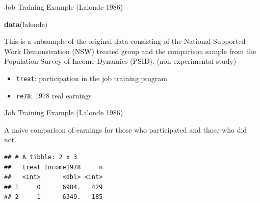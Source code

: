 \documentclass[ignorenonframetext,]{beamer}
\newenvironment{Shaded}{\begin{snugshade}}{\end{snugshade}}
\newcommand{\KeywordTok}[1]{\textcolor[rgb]{0.13,0.29,0.53}{\textbf{#1}}}
\newcommand{\DataTypeTok}[1]{\textcolor[rgb]{0.13,0.29,0.53}{#1}}
\newcommand{\StringTok}[1]{\textcolor[rgb]{0.31,0.60,0.02}{#1}}
\newcommand{\OperatorTok}[1]{\textcolor[rgb]{0.81,0.36,0.00}{\textbf{#1}}}
\newcommand{\NormalTok}[1]{#1}
\providecommand{\tightlist}{%
  \setlength{\itemsep}{0pt}\setlength{\parskip}{0pt}}
\begin{document}
\begin{frame}[fragile]{Job Training Example (Lalonde 1986)}

\begin{Shaded}
\begin{Highlighting}[]
\KeywordTok{data}\NormalTok{(lalonde)}
\end{Highlighting}
\end{Shaded}

This is a subsample of the original data consisting of the National
Supported Work Demonstration (NSW) treated group and the comparison
sample from the Population Survey of Income Dynamics (PSID).
(non-experimental study)

\begin{itemize}
\tightlist
\item
  \texttt{treat}: participation in the job training program
\item
  \texttt{re78}: 1978 real earnings
\end{itemize}

\end{frame}

\begin{frame}[fragile]{Job Training Example (Lalonde 1986)}

A naive comparison of earnings for those who participated and those who
did not.

\small

\begin{Shaded}
\end{Shaded}

\begin{verbatim}
## # A tibble: 2 x 3
##   treat Income1978     n
##   <int>      <dbl> <int>
## 1     0      6984.   429
## 2     1      6349.   185
\end{verbatim}

\normalsize

\end{frame}
\end{document}
